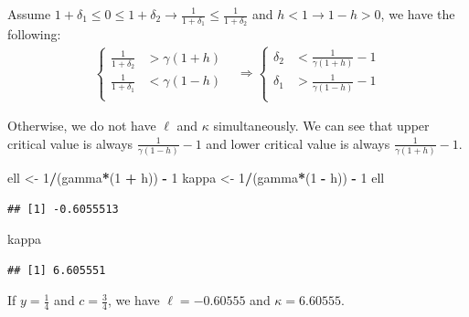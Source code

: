 \documentclass[
]{article}
\newenvironment{Shaded}{\begin{snugshade}}{\end{snugshade}}
\newcommand{\DecValTok}[1]{\textcolor[rgb]{0.00,0.00,0.81}{#1}}
\newcommand{\NormalTok}[1]{#1}
\newcommand{\OtherTok}[1]{\textcolor[rgb]{0.56,0.35,0.01}{#1}}
\newcommand{\SpecialCharTok}[1]{\textcolor[rgb]{0.81,0.36,0.00}{\textbf{#1}}}
\begin{document}
Assume
\(1 + \delta_1 \leq 0 \leq 1+\delta_2 \rightarrow \frac{1}{1+\delta_1}\leq\frac{1}{1+\delta_2}\)
and \(h <1 \rightarrow 1-h>0\), we have the following: \begin{align*}
\left\{
\begin{array}{ll}
\frac{1}{1+\delta_2} & > \gamma(1+h) \\
\frac{1}{1+\delta_1} & < \gamma(1-h) \\
\end{array}
\right.
&\Rightarrow
\left\{
\begin{array}{ll}
\delta_2 & < \frac{1}{\gamma(1+h)} - 1 \\
\delta_1 & > \frac{1}{\gamma(1-h)} -1 \\
\end{array}
\right.
\end{align*}

Otherwise, we do not have \(\ell\) and \(\kappa\) simultaneously. We can
see that upper critical value is always \(\frac{1}{\gamma(1-h)} - 1\)
and lower critical value is always \(\frac{1}{\gamma(1+h)} - 1\).

\begin{Shaded}
\begin{Highlighting}[]
\NormalTok{ell }\OtherTok{\textless{}{-}} \DecValTok{1}\SpecialCharTok{/}\NormalTok{(gamma}\SpecialCharTok{*}\NormalTok{(}\DecValTok{1} \SpecialCharTok{+}\NormalTok{ h)) }\SpecialCharTok{{-}} \DecValTok{1}
\NormalTok{kappa }\OtherTok{\textless{}{-}} \DecValTok{1}\SpecialCharTok{/}\NormalTok{(gamma}\SpecialCharTok{*}\NormalTok{(}\DecValTok{1} \SpecialCharTok{{-}}\NormalTok{ h)) }\SpecialCharTok{{-}} \DecValTok{1}
\NormalTok{ell}
\end{Highlighting}
\end{Shaded}

\begin{verbatim}
## [1] -0.6055513
\end{verbatim}

\begin{Shaded}
\begin{Highlighting}[]
\NormalTok{kappa}
\end{Highlighting}
\end{Shaded}

\begin{verbatim}
## [1] 6.605551
\end{verbatim}

If \(y = \frac{1}{4}\) and \(c = \frac{3}{4}\), we have
\(\ell = -0.60555\) and \(\kappa = 6.60555\).
\end{document}
